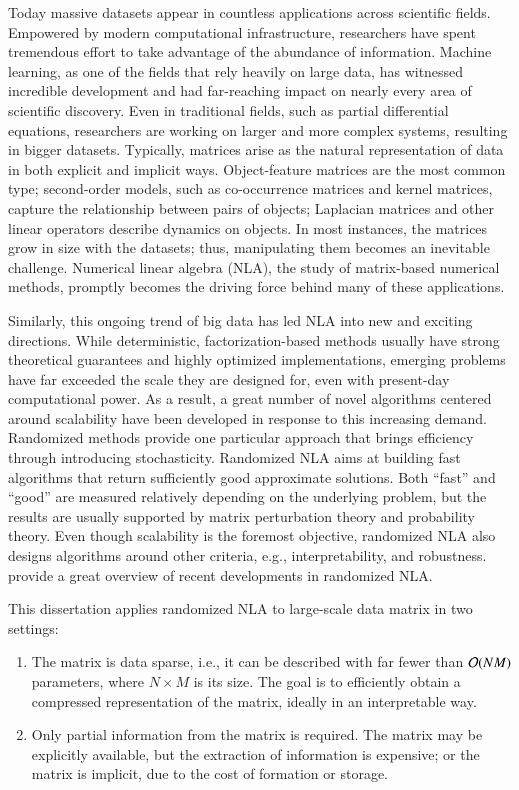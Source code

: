 Today massive datasets appear in countless applications across scientific
fields. Empowered by modern computational infrastructure, researchers have spent
tremendous effort to take advantage of the abundance of information. Machine
learning, as one of the fields that rely heavily on large data, has
witnessed incredible development and had far\hyp{}reaching impact on nearly
every area of scientific discovery. Even in traditional fields, such as partial
differential equations, researchers are working on larger and more complex
systems, resulting in bigger datasets. Typically, matrices arise as the natural
representation of data in both explicit and implicit ways. Object\hyp{}feature
matrices are the most common type; second\hyp{}order models, such as
co\hyp{}occurrence matrices and kernel matrices, capture the relationship
between pairs of objects; Laplacian matrices and other linear operators describe
dynamics on objects. In most instances, the matrices grow in size with the
datasets; thus, manipulating them becomes an inevitable challenge. Numerical
linear algebra (NLA), the study of matrix\hyp{}based numerical methods, promptly
becomes the driving force behind many of these applications.

Similarly, this ongoing trend of big data has led NLA into new and exciting
directions. While deterministic, factorization\hyp{}based methods usually have
strong theoretical guarantees and highly optimized implementations, emerging
problems have far exceeded the scale they are designed for, even with 
present\hyp{}day computational power. As a result, a great number of novel
algorithms centered around scalability have been developed in response to this
increasing demand. Randomized methods provide one particular approach that
brings efficiency through introducing stochasticity. Randomized NLA aims at
building fast algorithms that return sufficiently good approximate solutions.
Both ``fast'' and ``good'' are measured relatively depending on the underlying
problem, but the results are usually supported by matrix perturbation
theory and probability theory. Even though scalability is the foremost
objective, randomized NLA also designs algorithms around other criteria, e.g.,
interpretability, and robustness. \citet{drineas2016randnla} provide a great
overview of recent developments in randomized NLA.

This dissertation applies randomized NLA to large-scale data matrix in two
settings:
\begin{enumerate}
	\item The matrix is data sparse, i.e., it can be described with far fewer
	than $\mathcal{O}(NM)$ parameters, where $N\times M$ is its size. The goal is to
	efficiently obtain a compressed representation of the matrix, ideally in an
	interpretable way.
	\item Only partial information from the matrix is required. The matrix
	may be explicitly available, but the extraction of information is expensive;
	or the matrix is implicit, due to the cost of formation or storage.
\end{enumerate}

